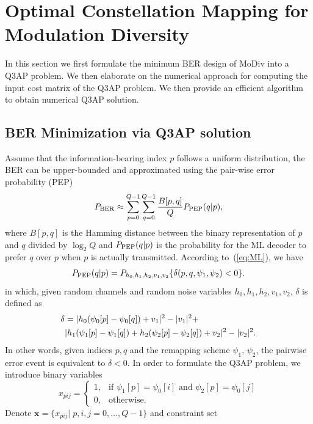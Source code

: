 \documentclass[journal,draftcls,onecolumn,12pt,twoside]{IEEEtran}
\newcommand{\PEP}{\rm{PEP}}
\newcommand{\BER}{\rm{BER}}
\begin{document}
\section{Optimal Constellation Mapping for Modulation Diversity}
\label{sec:core}
In this section we first formulate the minimum BER design of MoDiv into a Q3AP
problem. We then elaborate on the numerical approach for computing the input
cost matrix of the Q3AP problem. We then provide an efficient algorithm to
obtain numerical Q3AP solution.

\subsection{BER Minimization via Q3AP solution}
Assume that the information-bearing index $p$ follows a uniform distribution,
the BER can be upper-bounded and approximated using the pair-wise error
probability (PEP)~\cite{harvind2005symbol}
\begin{align}
    P_{\BER} \approx \sum_{p=0}^{Q - 1}\sum_{q=0}^{Q - 1}\frac{B[p,
    q]}{Q}P_{\PEP}(q | p), \label{eq:P_BER}
\end{align}
where $B[p,q]$ is the Hamming distance between the binary representation of $p$
and $q$ divided by $\log_2Q$ and $P_{\PEP}(q | p)$ is the probability for the ML
decoder to prefer $q$ over $p$ when $p$ is actually transmitted. According
to~(\ref{eq:ML}), we have
\begin{align}
    P_{\PEP}(q | p) = P_{h_0,h_1,h_2,v_1,v_2}\{\delta(p,q,\psi_1,\psi_2) < 0\}.
    \label{eq:P_PEP}
\end{align}
in which, given random channels and random noise variables 
$h_0,h_1,h_2,v_1,v_2$, $\delta$ is defined as
\begin{align}
    \delta & = |h_0(\psi_0[p] - \psi_0[q]) + v_1|^2 - |v_1|^2 +\notag\\ 
    &
    |h_1(\psi_1[p] - \psi_1[q])+h_2(\psi_2[p] - \psi_2[q])+v_2|^2 -
    |v_2|^2.
    \label{eq:delta}
\end{align}
In other words, given indices $p, q$ and the remapping scheme $\psi_1$,
$\psi_2$, the pairwise error event is equivalent to $\delta<0$. In order to
formulate the Q3AP problem, we introduce binary variables
\[
    x_{pij}= \left\{\begin{array}{ll}
        1,& \mbox{if $\psi_1[p] = \psi_0[i]$ and $\psi_2[p] = \psi_0[j]$}\\
        0,& \mbox{otherwise.} \end{array} 
    \right.
\]
Denote $\mathbf{x} = \{x_{pij}|\;p,i,j=0,\ldots,Q-1\}$ and constraint set
\end{document}
